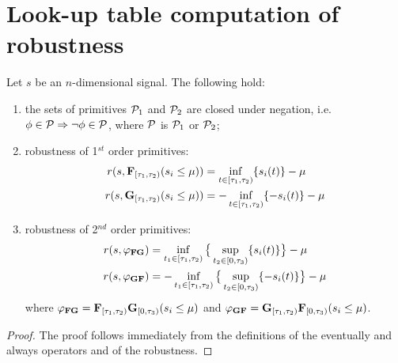\clearpage
\section{Look-up table computation of robustness}
\begin{proposition}
\label{th:primitives-props}
Let $s$ be an $n$-dimensional signal. The following hold:
\begin{enumerate}
    \item the sets of primitives $\mathcal{P}_1$ and $\mathcal{P}_2$ are
    closed under negation, i.e. $\phi \in \mathcal{P} \Rightarrow \neg\phi \in \mathcal{P}$,
    where $\mathcal{P}$ is $\mathcal{P}_1$ or $\mathcal{P}_2$;
    \item robustness  of 1$^{st}$ order primitives:
    \begin{align}
    	r(s, \mathbf{F}_{[\tau_1, \tau_2)} (s_i \leq \mu)) &= \inf_{t \in [\tau_1, \tau_2)} \{ s_i(t) \} - \mu \\
    	r(s, \mathbf{G}_{[\tau_1, \tau_2)} (s_i \leq \mu)) &= -\inf_{t \in [\tau_1, \tau_2)} \{ -s_i(t) \} - \mu
    \end{align}
    \item robustness  of 2$^{nd}$ order primitives:
    \begin{align}
    	r(s, \varphi_{\mathbf{F}\mathbf{G}}) &= \inf_{t_1 \in [\tau_1, \tau_2)} \big\{  \sup_{t_2 \in [0, \tau_3)} \{ s_i(t) \} \big\} - \mu \\
    	r(s, \varphi_{\mathbf{G}\mathbf{F}}) &= -\inf_{t_1 \in [\tau_1, \tau_2)} \big\{  \sup_{t_2 \in [0, \tau_3)} \{ -s_i(t) \} \big\} - \mu
    \end{align}
    where $\varphi_{\mathbf{F}\mathbf{G}} = \mathbf{F}_{[\tau_1, \tau_2)} \mathbf{G}_{[0, \tau_3)} (s_i \leq \mu)$
    and \quad $\varphi_{\mathbf{G}\mathbf{F}} = \mathbf{G}_{[\tau_1, \tau_2)} \mathbf{F}_{[0, \tau_3)} (s_i \leq \mu)$.
\end{enumerate}
\end{proposition}
\begin{proof}
The proof follows immediately from the definitions of the eventually and always operators and of the robustness.
\end{proof}




